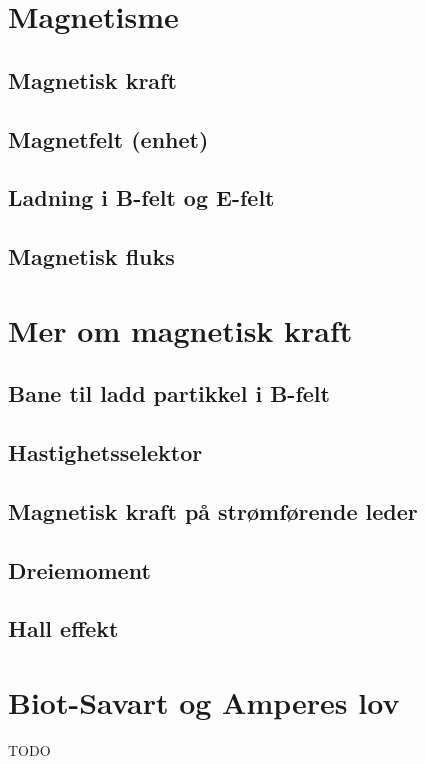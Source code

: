 \documentclass{article}
\begin{document}
  \section{Magnetisme}
    \subsection{Magnetisk kraft}
      
    \subsection{Magnetfelt (enhet)}
      
    \subsection{Ladning i B-felt og E-felt}
      
    \subsection{Magnetisk fluks}
      
  \section{Mer om magnetisk kraft}
    \subsection{Bane til ladd partikkel i B-felt}
      
    \subsection{Hastighetsselektor}
      
    \subsection{Magnetisk kraft på strømførende leder}
      
    \subsection{Dreiemoment}
      
    \subsection{Hall effekt}
      
  \section{Biot-Savart og Amperes lov}
    TODO
\end{document}
